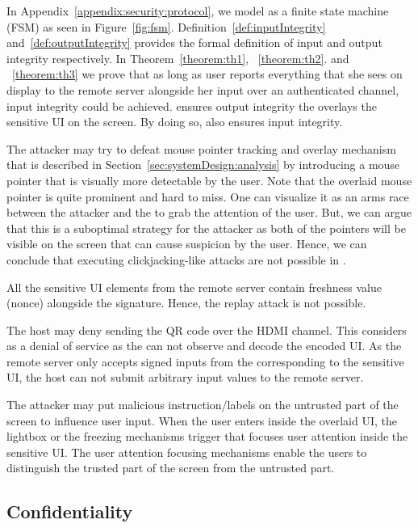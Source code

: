 In Appendix~\ref{appendix:security:protocol}, we model \name as a finite state machine (FSM) as seen in Figure~\ref{fig:fsm}. Definition~\ref{def:inputIntegrity} and~\ref{def:outputIntegrity} provides the formal definition of input and output integrity respectively. In Theorem~\ref{theorem:th1}, ~\ref{theorem:th2}. and ~\ref{theorem:th3} we prove that as long as user reports everything that she sees on display to the remote server alongside her input over an authenticated channel, input integrity could be achieved. \name ensures output integrity the \device overlays the sensitive UI on the screen. By doing so, \name also ensures input integrity.  


 The attacker may try to defeat \name mouse pointer tracking and overlay mechanism that is described in Section~\ref{sec:systemDesign:analysis} by introducing a mouse pointer that is visually more detectable by the user. Note that the \device overlaid mouse pointer is quite prominent and hard to miss. One can visualize it as an arms race between the attacker and the \device to grab the attention of the user. But, we can argue that this is a suboptimal strategy for the attacker as both of the pointers will be visible on the screen that can cause suspicion by the user. Hence, we can conclude that executing clickjacking-like attacks are not possible in \name.

 All the sensitive UI elements from the remote server contain freshness value (nonce) alongside the signature. Hence, the replay attack is not possible.

 The host may deny sending the QR code over the HDMI channel. This considers as a denial of service as the \device can not observe and decode the encoded UI. As the remote server only accepts signed inputs from the \device corresponding to the sensitive UI, the host can not submit arbitrary input values to the remote server.

 The attacker may put malicious instruction/labels on the untrusted part of the screen to influence user input. When the user enters inside the overlaid UI, the lightbox or the freezing mechanisms trigger that focuses user attention inside the sensitive UI. The user attention focusing mechanisms enable the users to distinguish the trusted part of the screen from the untrusted part.

\subsection{Confidentiality}

